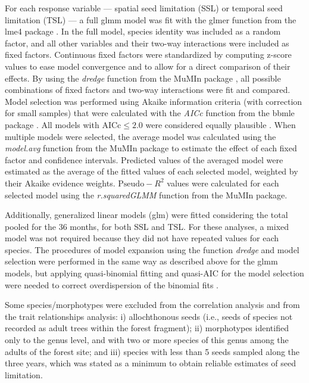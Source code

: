 \documentclass[A4]{article}
\begin{document}
For each response variable — spatial seed limitation (SSL) or temporal
seed limitation (TSL) — a full glmm model was fit with the glmer
function from the lme4 package \cite{lme4}. In the full model, species
identity was included as a random factor, and all other variables and
their two-way interactions were included as fixed factors. Continuous
fixed factors were standardized by computing z-score values to ease
model convergence \cite{Zuur2009book} and to allow for a direct
comparison of their effects. By using the \emph{dredge} function from
the MuMIn package \cite{MuMIn}, all possible combinations of fixed
factors and two-way interactions were fit and compared. Model
selection was performed using Akaike information criteria (with
correction for small samples) that were calculated with the
\emph{AICc} function from the bbmle package \cite{bbmle}. All models
with $\mathrm{AICc} \leq 2.0$ were considered equally plausible
\cite{Burnham2002}. When multiple models were selected, the average
model was calculated \cite{Burnham2002} using the \emph{model.avg}
function from the MuMIn package \cite{MuMIn} to estimate the effect of
each fixed factor and confidence intervals. Predicted values of the
averaged model were estimated as the average of the fitted values of
each selected model, weighted by their Akaike evidence
weights. $\mathrm{Pseudo-}R^2$ \cite{nakagawa2017} values were
calculated for each selected model using the \emph{r.squaredGLMM}
function from the MuMIn package.

Additionally, generalized linear models (glm) were fitted considering
the total pooled for the 36 months, for both SSL and TSL. For these
analyses, a mixed model was not required because they did not have
repeated values for each species. The procedures of model expansion
using the function \emph{dredge} and model selection were performed in
the same way as described above for the glmm models, but applying
quasi-binomial fitting and quasi-AIC for the model selection were
needed to correct overdispersion of the binomial fits
\cite{Zuur2009book}.

Some species/morphotypes were excluded from the correlation analysis
and from the trait relationships analysis: i) allochthonous seeds
(i.e., seeds of species not recorded as adult trees within the forest
fragment); ii) morphotypes identified only to the genus level, and
with two or more species of this genus among the adults of the forest
site; and iii) species with less than 5 seeds sampled along the three
years, which was stated as a minimum to obtain reliable estimates of
seed limitation.
\end{document}
